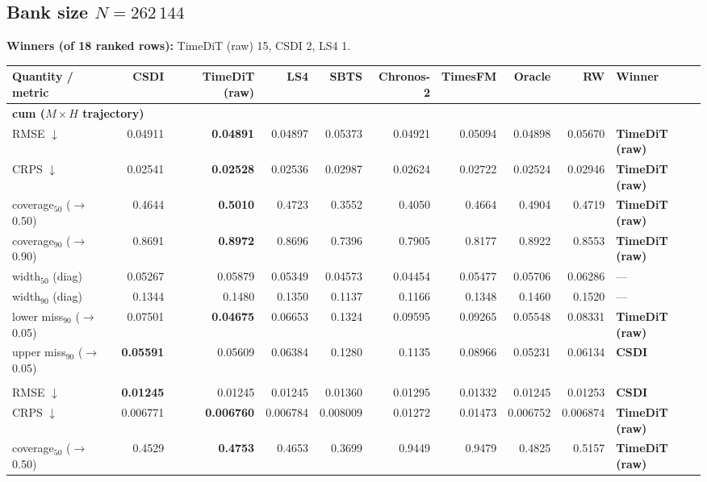 \documentclass[11pt,a4paper]{article}
\begin{document}
\begin{landscape}
\section*{Bank size $N = 262\,144$}
\noindent\textbf{Winners (of 18 ranked rows):} TimeDiT (raw) 15, CSDI 2, LS4 1.
\begin{center}\small
\begin{tabular}{lrrrrrrrrl}
\toprule
Quantity / metric & CSDI & TimeDiT (raw) & LS4 & SBTS & Chronos-2 & TimesFM & Oracle & RW & Winner \\
\midrule
\multicolumn{10}{l}{\textbf{cum ($M\times H$ trajectory)}} \\
RMSE $\downarrow$ & 0.04911 & \textbf{0.04891} & 0.04897 & 0.05373 & 0.04921 & 0.05094 & 0.04898 & 0.05670 & \textbf{TimeDiT (raw)} \\
CRPS $\downarrow$ & 0.02541 & \textbf{0.02528} & 0.02536 & 0.02987 & 0.02624 & 0.02722 & 0.02524 & 0.02946 & \textbf{TimeDiT (raw)} \\
coverage$_{50}$ ($\to$0.50) & 0.4644 & \textbf{0.5010} & 0.4723 & 0.3552 & 0.4050 & 0.4664 & 0.4904 & 0.4719 & \textbf{TimeDiT (raw)} \\
coverage$_{90}$ ($\to$0.90) & 0.8691 & \textbf{0.8972} & 0.8696 & 0.7396 & 0.7905 & 0.8177 & 0.8922 & 0.8553 & \textbf{TimeDiT (raw)} \\
width$_{50}$ (diag) & 0.05267 & 0.05879 & 0.05349 & 0.04573 & 0.04454 & 0.05477 & 0.05706 & 0.06286 & --- \\
width$_{90}$ (diag) & 0.1344 & 0.1480 & 0.1350 & 0.1137 & 0.1166 & 0.1348 & 0.1460 & 0.1520 & --- \\
lower miss$_{90}$ ($\to$0.05) & 0.07501 & \textbf{0.04675} & 0.06653 & 0.1324 & 0.09595 & 0.09265 & 0.05548 & 0.08331 & \textbf{TimeDiT (raw)} \\
upper miss$_{90}$ ($\to$0.05) & \textbf{0.05591} & 0.05609 & 0.06384 & 0.1280 & 0.1135 & 0.08966 & 0.05231 & 0.06134 & \textbf{CSDI} \\
\addlinespace
\multicolumn{10}{l}{\textbf{step ($M\times H$)}} \\
RMSE $\downarrow$ & \textbf{0.01245} & 0.01245 & 0.01245 & 0.01360 & 0.01295 & 0.01332 & 0.01245 & 0.01253 & \textbf{CSDI} \\
CRPS $\downarrow$ & 0.006771 & \textbf{0.006760} & 0.006784 & 0.008009 & 0.01272 & 0.01473 & 0.006752 & 0.006874 & \textbf{TimeDiT (raw)} \\
coverage$_{50}$ ($\to$0.50) & 0.4529 & \textbf{0.4753} & 0.4653 & 0.3699 & 0.9449 & 0.9479 & 0.4825 & 0.5157 & \textbf{TimeDiT (raw)} \\

\end{tabular}
\end{center}
\end{landscape}
\end{document}
